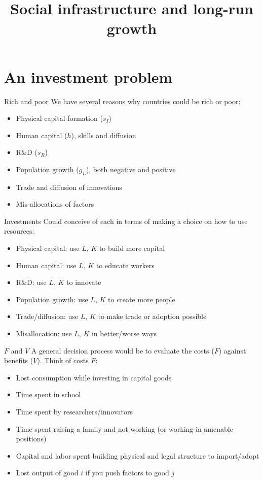 

\title[Social infrastructure]{Social infrastructure and long-run growth}



\maketitle

\section{An investment problem}
\begin{frame}{Rich and poor}
We have several reasons why countries could be rich or poor:
\begin{itemize}
	\item Physical capital formation ($s_I$)
	\item Human capital ($h$), skills and diffusion
	\item R\&D ($s_R$)
	\item Population growth ($g_L$), both negative and positive
	\item Trade and diffusion of innovations
	\item Mis-allocations of factors
\end{itemize}
\end{frame}

\begin{frame}{Investments}
Could conceive of each in terms of making a choice on how to use resources:
\begin{itemize}
	\item Physical capital: use $L$, $K$ to build more capital
	\item Human capital: use $L$, $K$ to educate workers
	\item R\&D: use $L$, $K$ to innovate
	\item Population growth: use $L$, $K$ to create more people
	\item Trade/diffusion: use $L$, $K$ to make trade or adoption possible 
	\item Misallocation: use $L$, $K$ in better/worse ways
\end{itemize}
\end{frame}

\begin{frame}{$F$ and $V$}
A general decision process would be to evaluate the costs ($F$) against benefits ($V$). Think of costs $F$:
\begin{itemize}
	\item Lost consumption while investing in capital goods
	\item Time spent in school
	\item Time spent by researchers/innovators
	\item Time spent raising a family and not working (or working in amenable positions)
	\item Capital and labor spent building physical and legal structure to import/adopt
	\item Lost output of good $i$ if you push factors to good $j$
\end{itemize}
\end{frame}

